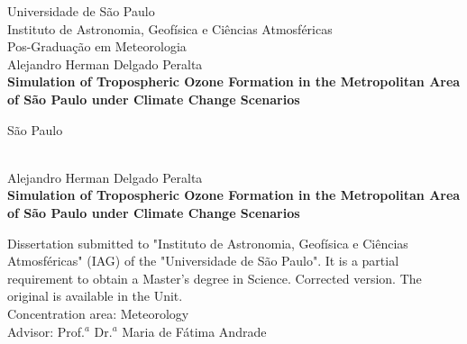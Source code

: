 


\frontmatter
\pagestyle{frontmatter}%
\begin{spacing}{1.5}
	
		\begin{titlepage}
		\begin{center}
			\vspace*{0.5cm}
			\Large{Universidade de S\~{a}o Paulo}\\
			\Large{Instituto de Astronomia, Geof\'{i}sica e Ci\^{e}ncias Atmosf\'{e}ricas}\\
			\Large{Pos-Gradua\c{c}\~{a}o em Meteorologia}\\[3cm]
			Alejandro Herman Delgado Peralta \\[3cm]

			\huge{\textbf{Simulation of Tropospheric Ozone Formation in the Metropolitan Area of S\~{a}o Paulo under Climate Change Scenarios}}\\[3mm]
			\vfill

			S\~{a}o Paulo \\
			\the\year \\
			
		\end{center}
	\end{titlepage}
	
	\newpage
	\thispagestyle{empty}
	\begin{titlepage}
		\begin{center}
			\vspace*{0.5cm}
			\Large{Alejandro Herman Delgado Peralta}\\[4cm]

			\huge{\textbf{Simulation of Tropospheric Ozone Formation in the Metropolitan Area of S\~{a}o Paulo under Climate Change Scenarios}}\\[4cm]
		\end{center}
		\hfill\begin{minipage}{0.5\linewidth}
		Dissertation submitted to "Instituto de Astronomia, Geof\'{i}sica e Ci\^{e}ncias Atmosf\'{e}ricas" (IAG) of the "Universidade de S\~{a}o Paulo". It is a partial requirement to obtain a Master's degree in Science. Corrected version. The original is available in the Unit.\\[1cm]
				Concentration area: Meteorology\\
				Advisor: Prof.$^a$ Dr.$^a$ Maria de F\'{a}tima Andrade
		\end{minipage}
	

\end{titlepage}
\end{spacing}
